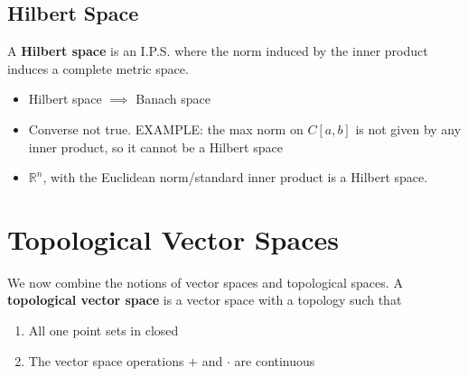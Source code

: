 \documentclass{article}
\newcommand{\R}{\mathbb{R}}
\theoremstyle{plain}
\theoremstyle{definition}
\begin{document}
		\subsection{Hilbert Space}
		A \textbf{Hilbert space} is an I.P.S. where the norm induced by the inner product induces a complete metric space. 
		\begin{itemize}
				\item Hilbert space $\implies$ Banach space 
				\item Converse not true. EXAMPLE: the max norm on $C[a,b]$ is not given by any inner product, so it cannot be a Hilbert space
				\item $\R^n$, with the Euclidean norm/standard inner product is a Hilbert space. 
		\end{itemize}

		\section{Topological Vector Spaces}
		We now combine the notions of vector spaces and topological spaces. A \textbf{topological vector space} is a vector space with a topology such that 
		\begin{enumerate}
				\item All one point sets in closed 
				\item The vector space operations $+$ and $\cdot$ are continuous
		\end{enumerate}
\end{document}
